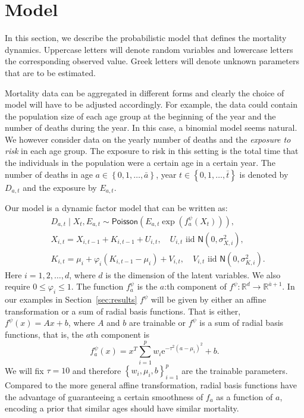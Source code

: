 \documentclass[preprint,12pt]{elsarticle}
\newcommand{\cur}[1]{\left\{#1\right\}}
\newcommand{\pa}[1]{\left(#1\right)}
\def\ee{\ensuremath{\mathrm{e}}}
\begin{document}
\section{Model}\label{sec:model}
In this section, we describe the probabilistic model that defines the mortality dynamics. Uppercase letters will denote random variables and lowercase letters the corresponding observed value. Greek letters will denote unknown parameters that are to be estimated. 

Mortality data can be aggregated in different forms and clearly the choice of model will have to be adjusted accordingly. For example, the data could contain the population size of each age group at the beginning of the year and the number of deaths during the year. In this case, a binomial model seems natural. We however consider data on the yearly number of deaths and the \emph{exposure to risk} in each age group. The exposure to risk in this setting is the total time that the individuals in the population were a certain age in a certain year.  The number of deaths in age $a\in \cur{0,1,\ldots, \bar a}$, year $t\in \cur{0,1,\ldots, \bar t}$ is denoted by $D_{a,t}$ and the exposure by $E_{a,t}$. 

Our model is a dynamic factor model that can be written as:
\begin{align}
	& D_{a,t}\mid X_t,E_{a,t} \sim  \mathsf{Poisson}\pa{E_{a,t}\exp\pa{f^\psi_{a}(X_t)}},\label{eq:deathDist}\\
	& X_{i,t} =X_{i,t-1} + K_{i,t-1} + U_{i,t},\quad U_{i,t} \text{ iid }  \mathsf{N}(0,\sigma^2_{X,i}),\label{eq:state_level}\\
	& K_{i,t} = \mu_i + \varphi_i(K_{i,t-1} - \mu_i) + V_{i,t},\quad V_{i,t} \text{ iid }   \mathsf{N}(0,\sigma^2_{K,i}).\label{eq:state_trend}
\end{align}
Here $i=1,2,\ldots , d$, where $d$ is the dimension of the latent variables. We also require $0\leq \varphi_i \leq 1$. The function $f^\psi_a$ is the $a$:th component of $f^\psi:\mathbb R^d \to \mathbb R^{\bar a+1}$. In our examples in Section~\ref{sec:results} $f^\psi$ will be given by either an affine transformation or a sum of radial basis functions. That is either, $f^\psi(x) = Ax + b$, where $A$ and $b$ are trainable or $f^\psi$ is a sum of radial basis functions, that is, the $a$th component is
$$
f^\psi_a(x) = x^T\sum_{i=1}^p w_i \ee^{-\tau^2(a-\mu_i)^2} + b.
$$
We will fix $\tau = 10$ and therefore $\cur{w_i ,\mu_i, b}_{i=1}^p$ are the trainable parameters. Compared to the more general affine transformation, radial basis functions have the advantage of guaranteeing a certain smoothness of $f_a$ as a function of $a$, encoding a prior that similar ages should have similar mortality.
\end{document}
